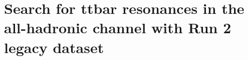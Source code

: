 \chapter{Search for ttbar resonances in the all-hadronic channel with Run 2 legacy dataset}\label{chap:conclusion}

